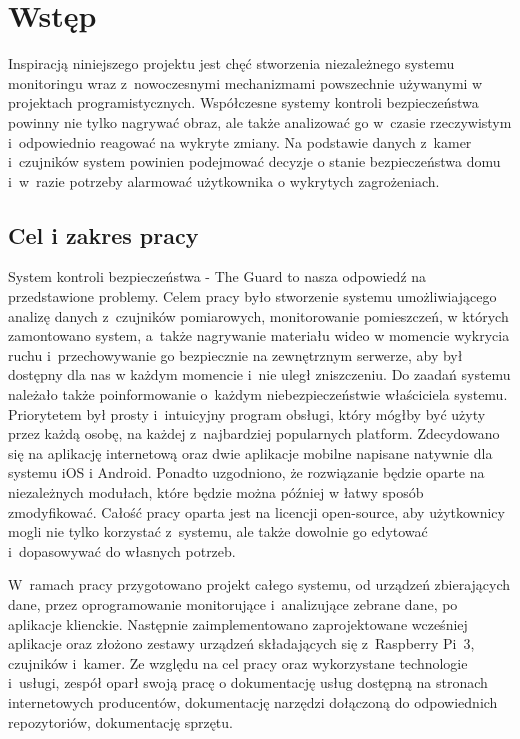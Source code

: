 \chapter{Wstęp}
Inspiracją niniejszego projektu jest chęć stworzenia niezależnego systemu monitoringu wraz z~nowoczesnymi mechanizmami powszechnie używanymi w projektach programistycznych.
Współczesne systemy kontroli bezpieczeństwa powinny nie tylko nagrywać obraz, ale także analizować go w~czasie rzeczywistym i~odpowiednio reagować na wykryte zmiany. Na podstawie danych z~kamer i~czujników system powinien podejmować decyzje o stanie bezpieczeństwa domu i~w~razie potrzeby alarmować użytkownika o wykrytych zagrożeniach.

\section{Cel i zakres pracy}
System kontroli bezpieczeństwa - The Guard to nasza odpowiedź na przedstawione problemy. Celem pracy było stworzenie systemu umożliwiającego analizę danych z~czujników pomiarowych, monitorowanie pomieszczeń, w których zamontowano system, a~także nagrywanie materiału wideo w momencie wykrycia ruchu i~przechowywanie go bezpiecznie na zewnętrznym serwerze, aby był dostępny dla nas w każdym momencie i~nie uległ zniszczeniu. Do zaadań systemu należało także poinformowanie o~każdym niebezpieczeństwie właściciela systemu. Priorytetem był prosty i~intuicyjny program obsługi, który mógłby być użyty przez każdą osobę, na każdej z~najbardziej popularnych platform. Zdecydowano się na aplikację internetową oraz dwie aplikacje mobilne napisane natywnie dla systemu iOS i Android. Ponadto uzgodniono, że rozwiązanie będzie oparte na niezależnych modułach, które będzie można później w łatwy sposób zmodyfikować. Całość pracy oparta jest na licencji open-source, aby użytkownicy mogli nie tylko korzystać z~systemu, ale także dowolnie go edytować i~dopasowywać do własnych potrzeb.

W~ramach pracy przygotowano projekt całego systemu, od urządzeń zbierających dane, przez oprogramowanie monitorujące i~analizujące zebrane dane, po aplikacje klienckie. Następnie zaimplementowano zaprojektowane wcześniej aplikacje oraz złożono zestawy urządzeń składających się z~Raspberry Pi~3, czujników i~kamer.
Ze względu na cel pracy oraz wykorzystane technologie i~usługi, zespół oparł swoją pracę o dokumentację usług dostępną na stronach internetowych producentów, dokumentację narzędzi dołączoną do odpowiednich repozytoriów, dokumentację sprzętu.

